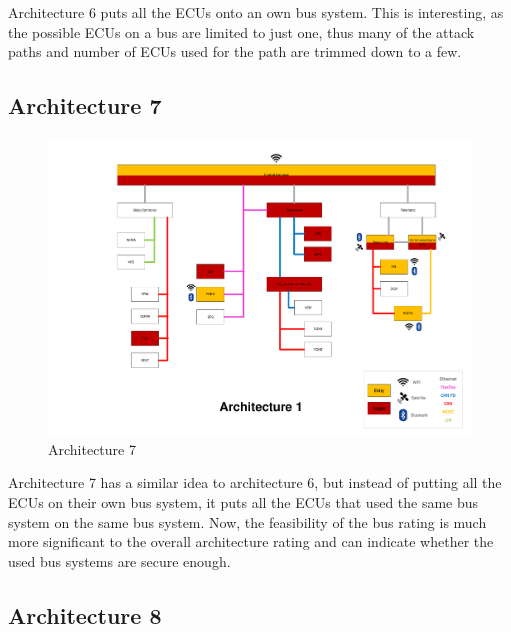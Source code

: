 Architecture 6 puts all the ECUs onto an own bus system.
This is interesting, as the possible ECUs on a bus are limited to just one, thus many of the attack paths and number of ECUs used for the path are trimmed down to a few.
\par


\subsection*{Architecture 7}
\label{sec:arch7}

\begin{figure}[h!]
    \caption{Architecture 7}
    \includegraphics[width=\textwidth, page=7]{../Architectures-survey.pdf}
\end{figure}

Architecture 7 has a similar idea to architecture 6, but instead of putting all the ECUs on their own bus system, it puts all the ECUs that used the same bus system on the same bus system.
Now, the feasibility of the bus rating is much more significant to the overall architecture rating and can indicate whether the used bus systems are secure enough.\par



\subsection*{Architecture 8}
\label{sec:arch8}

